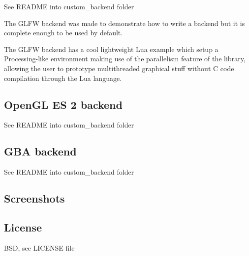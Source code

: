 See {\ttfamily R\+E\+A\+D\+ME} into {\ttfamily custom\+\_\+backend} folder

The G\+L\+FW backend was made to demonstrate how to write a backend but it is complete enough to be used by default.

The G\+L\+FW backend has a cool lightweight Lua example which setup a Processing-\/like environment making use of the parallelism feature of the library, allowing the user to prototype multithreaded graphical stuff without C code compilation through the Lua language.

\subsection*{Open\+GL ES 2 backend}

See {\ttfamily R\+E\+A\+D\+ME} into {\ttfamily custom\+\_\+backend} folder

\subsection*{G\+BA backend}

See {\ttfamily R\+E\+A\+D\+ME} into {\ttfamily custom\+\_\+backend} folder

\subsection*{Screenshots}











\subsection*{License}

B\+SD, see L\+I\+C\+E\+N\+SE file 